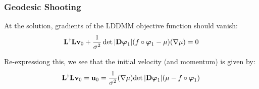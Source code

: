 

\begin{frame}
\frametitle{Geodesic Shooting}
At the solution, gradients of the LDDMM objective function should vanish:
\begin{align*}
{\bf L}^{\dagger}{\bf L} {\bf v}_{0} + \frac{1}{\sigma^2} \det | {\bf D}{\boldsymbol\varphi}_{1} | (f \circ {\boldsymbol\varphi}_1 - \mu)(\nabla \mu) = 0
\end{align*}

Re-expressiong this, we see that the initial velocity (and momentum) is given by:
\begin{align*}
{\bf L}^{\dagger}{\bf L} {\bf v}_{0} = {\bf u}_0 = {\frac{1}{\sigma^2} (\nabla \mu)} {\det | {\bf D}{\boldsymbol\varphi}_{1} | (\mu - f \circ {\boldsymbol\varphi}_1)}
\end{align*}
\end{frame}

